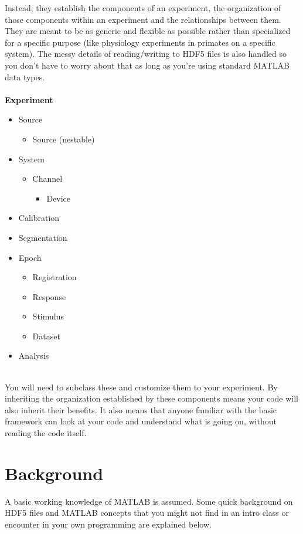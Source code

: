 \documentclass[10pt]{exam}
\begin{document}
	Instead, they establish the components of an experiment, the organization of those components within an experiment and the relationships between them. They are meant to be as generic and flexible as possible rather than specialized for a specific purpose (like physiology experiments in primates on a specific system). The messy details of reading/writing to HDF5 files is also handled so you don't have to worry about that as long as you're using standard MATLAB data types. 
	\\$\quad$\\
	\textbf{Experiment}
	\begin{itemize}
		\item Source
		\begin{itemize}
			\item Source (nestable)
		\end{itemize}
		\item System
		\begin{itemize}
			\item Channel
			\begin{itemize}
				\item Device
			\end{itemize}
		\end{itemize}
		\item Calibration
		\item Segmentation
		\item Epoch
		\begin{itemize}
			\item Registration
			\item Response
			\item Stimulus
			\item Dataset
		\end{itemize}
		\item Analysis
	\end{itemize}
	$\quad$\\
	You will need to subclass these and customize them to your experiment. By inheriting the organization established by these components means your code will also inherit their benefits. It also means that anyone familiar with the basic framework can look at your code and understand what is going on, without reading the code itself.
	
\section{Background}
	\noindent A basic working knowledge of MATLAB is assumed. Some quick background on HDF5 files and MATLAB concepts that you might not find in an intro class or encounter in your own programming are explained below. 
\end{document}
